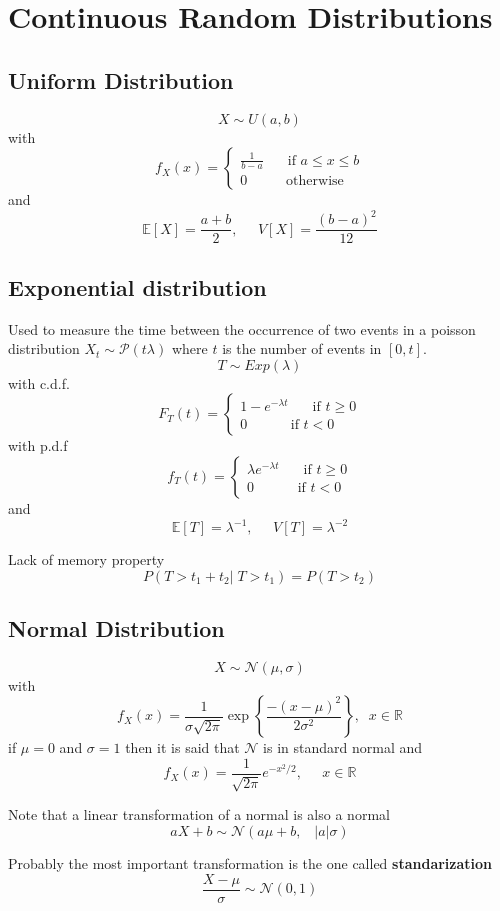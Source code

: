 
\section{Continuous Random Distributions}
\subsection{Uniform Distribution}
\[ X \sim U(a,b) \]
with
\[f_X(x)=
    \begin{cases}
        \frac{1}{b-a}\;\;\;\;\;\text{ if } a\leq x \leq b\\
        0\;\;\;\;\;\;\;\;\;\;\text{otherwise}
    \end{cases}
\]
and
\[ \mathbb{E}[X]=\frac{a+b}{2},\;\;\;\;\;V[X]=\frac{(b-a)^2}{12} \]

\subsection{Exponential distribution}
Used to measure the time between the occurrence of two events in a poisson
distribution $X_t\sim\mathcal{P}(t\lambda)$ where $t$ is the number of events in $[0,t]$.
\[ T \sim Exp(\lambda) \]
with c.d.f.
\[F_T(t)=
    \begin{cases}
        1-e^{-\lambda t}\;\;\;\;\;\text{ if } t\geq 0\\
        0\;\;\;\;\;\;\;\;\;\;\text{ if } t<0
    \end{cases}
\]
with p.d.f
\[f_T(t)=
    \begin{cases}
        \lambda e^{-\lambda t}\;\;\;\;\;\text{ if } t\geq 0\\
        0\;\;\;\;\;\;\;\;\;\;\text{ if } t<0
    \end{cases}
\]
and
\[ \mathbb{E}[T]=\lambda^{-1},\;\;\;\;\;V[T]=\lambda^{-2} \]
\begin{tcolorbox}
    Lack of memory property
    \[ P(T>t_1 + t_2 |\;T>t_1) = P(T>t_2) \]
\end{tcolorbox}

\subsection{Normal Distribution}
\[ X \sim \mathcal{N}(\mu,\sigma) \]
with
\[
f_X(x)=\frac{1}{\sigma\sqrt{2\pi}}\exp\left\{\frac{-(x-\mu)^2}{2\sigma^2}\right\},\;\;
x\in\mathbb{R} \] 
if $\mu=0$ and $\sigma=1$ then it is said that $\mathcal{N}$
is in standard normal and
\[ f_X(x)=\frac{1}{\sqrt{2\pi}}e^{-x^2/2},\;\;\;\;\; x\in\mathbb{R} \]
\begin{tcolorbox}
    Note that a linear transformation of a normal is also a normal
    \[aX+b \sim \mathcal{N}(a\mu+b,\;\;\;|a|\sigma)\]
\end{tcolorbox}
\begin{tcolorbox}
    Probably the most important transformation is the one called \textbf{standarization}
    \[\frac{X-\mu}{\sigma}\sim\mathcal{N}(0,1)\]
\end{tcolorbox}

